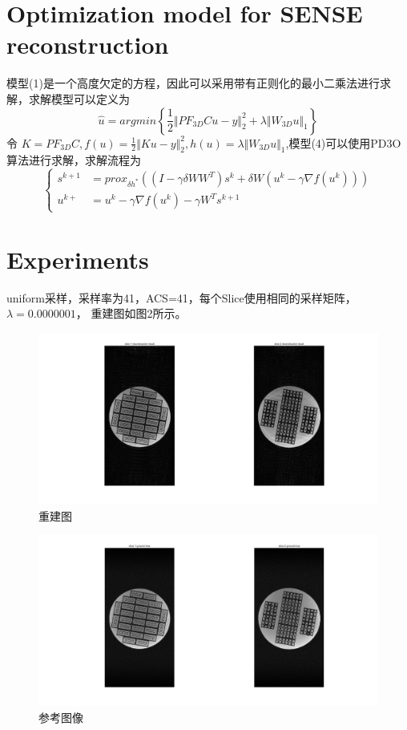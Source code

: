 \documentclass[lang=cn,11pt,a4paper,cite=numbers]{elegantpaper}
\begin{document}
\section{Optimization model for SENSE reconstruction}
\par 模型(1)是一个高度欠定的方程，因此可以采用带有正则化的最小二乘法进行求解，求解模型可以定义为
\begin{equation}
	\hat{u} = argmin \left\lbrace \frac{1}{2} \Vert PF_{3D}Cu - y \Vert_2^2 + \lambda \Vert W_{3D}u \Vert_1 \right\rbrace 
\end{equation}
令 $K=PF_{3D}C, f(u) = \frac{1}{2} \Vert Ku - y \Vert_2^2,h(u)=\lambda \Vert W_{3D}u \Vert_1 $,模型(4)可以使用PD3O算法进行求解，求解流程为
\begin{equation}
	\left\{
	\begin{aligned}
		s^{k+1} &= prox_{\delta h^{*}}((I-\gamma \delta WW^T)s^k + \delta W(u^k -\gamma \nabla f(u^k))) \\
		u^{k+} &=u^k-\gamma \nabla f(u^k) - \gamma W^T s^{k+1}
	\end{aligned}
	\right.
\end{equation}

\section{Experiments}
\par uniform采样，采样率为41，ACS=41，每个Slice使用相同的采样矩阵，$\lambda = 0.0000001$， 重建图如图2所示。
\begin{figure}
	\centering
	\includegraphics[width=0.7\linewidth]{rec}
	\caption{重建图}
	\label{fig:rec}
\end{figure}

\begin{figure}
	\centering
	\includegraphics[width=0.7\linewidth]{true}
	\caption{参考图像}
	\label{fig:true}
\end{figure}
\end{document}
